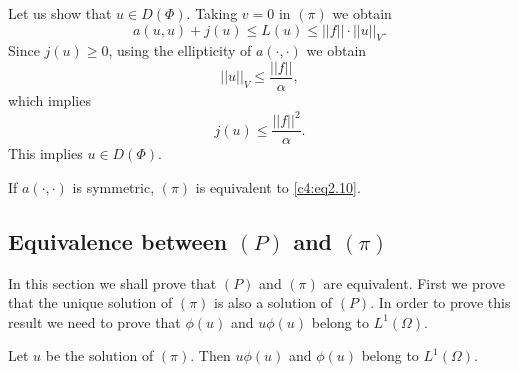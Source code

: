 Let us show that $u \in D (\Phi)$. Taking $v = 0$ in $(\pi)$ we obtain
\begin{equation}
a (u, u) + j (u) \leq L (u) \leq || f || \cdot || u ||_V.
\end{equation}
Since $j (u) \geq 0$, using the ellipticity of $a (\cdot, \cdot)$ we obtain
\begin{equation}
|| u ||_V \leq \frac{|| f ||}{\alpha}, \tag{2.20}\label{c4:eq2.20}
\end{equation}
which implies
\begin{equation}
j (u) \leq \frac{|| f ||^2} {\alpha}. \tag{2.21}\label{c4:eq2.21}
\end{equation}
This implies $u \in D (\Phi)$. 

\begin{remark}\label{c4:rem2.3}%
If $a (\cdot , \cdot)$ is symmetric, $(\pi)$ is equivalent to \eqref{c4:eq2.10}.
 \end{remark} 

\subsection{Equivalence between $(P)$ and $(\pi)$}\label{c4:ss2.3} 
In this section we shall prove that $(P)$ and $(\pi)$ are equivalent. First we prove that the unique solution of $(\pi)$ is also a solution of $(P)$. In order to prove this result we need to prove that $\phi (u)$ and $u \phi (u)$ belong  to $L^1 (\Omega)$.
 
\begin{proposition}\label{c4:prop2.1}%
Let $u$ be the solution of $(\pi)$. Then $u \phi (u)$ and $\phi (u)$ belong to $L^1 (\Omega)$. 
 \end{proposition}

